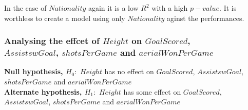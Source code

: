 \documentclass[12pt]{article}
\begin{document}
In the case of $ Nationality $ again it is a low $ R^2 $ with a high $ p-value $. It is worthless to create a model using only $ Nationality $ aginst the performances. 

\newpage

\subsubsection{Analysing the effcet of $ Height $ on $ GoalScored $, \\ $ AssistswGoal $, $ shotsPerGame $ and $ aerialWonPerGame $}

\textbf{Null hypothesis, $ H_0: $} $ Height $ has no effect on $ GoalScored $, $ AssistswGoal $, $ shotsPerGame $ and $ aerialWonPerGame $\\
\textbf{Alternate hypothesis, $ H_1: $} $ Height $ has some effect on $ GoalScored $, $ AssistswGoal $, $ shotsPerGame $ and $ aerialWonPerGame $
	
\end{document}
